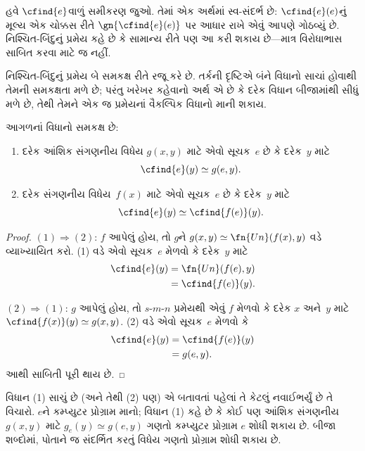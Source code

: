 હવે $\cfind{e}$વાળું સમીકરણ જુઓ. તેમાં એક અર્થમાં
સ્વ-સંદર્ભ છે: $\cfind{e}(e)$નું મૂલ્ય એક ચોક્કસ રીતે
$\gn{\cfind{e}(e)}$ પર આધાર રાખે એવું આપણે ગોઠવ્યું છે.
નિશ્ચિત-બિંદુનું પ્રમેય કહે છે કે સામાન્ય રીતે પણ આ કરી
શકાય છે---માત્ર વિરોધાભાસ સાબિત કરવા માટે જ નહીં.

 નિશ્ચિત-બિંદુનું પ્રમેય બે સમકક્ષ
રીતે રજૂ કરે છે. તર્કની દૃષ્ટિએ બંને વિધાનો સાચાં હોવાથી
તેમની સમકક્ષતા મળે છે; પરંતુ ખરેખર કહેવાનો અર્થ એ છે કે
દરેક વિધાન બીજામાંથી સીધું મળે છે, તેથી તેમને એક જ પ્રમેયનાં
વૈકલ્પિક વિધાનો માની શકાય.

\begin{lem}
આગળનાં વિધાનો સમકક્ષ છે:
\begin{enumerate}
\item દરેક આંશિક સંગણનીય વિધેય $g(x,y)$ માટે એવો
  સૂચક~$e$ છે કે દરેક~$y$ માટે
\[
\cfind{e}(y) \simeq g(e,y).
\]
\item દરેક સંગણનીય વિધેય~$f(x)$ માટે એવો સૂચક~$e$
  છે કે દરેક~$y$ માટે
\[
\cfind{e}(y) \simeq \cfind{f(e)}(y).
\]
\end{enumerate}
\end{lem}

\begin{proof}
$(1) \Rightarrow (2)$: $f$ આપેલું હોય, તો $g$ને
$g(x,y) \simeq \fn{Un}(f(x),y)$ વડે વ્યાખ્યાયિત કરો.
(1) વડે એવો સૂચક~$e$ મેળવો કે દરેક~$y$ માટે
\begin{align*}
\cfind{e}(y) & = \fn{Un}(f(e),y) \\
& = \cfind{f(e)}(y).
\end{align*}

$(2) \Rightarrow (1)$: $g$ આપેલું હોય, તો $s$-$m$-$n$
પ્રમેયથી એવું $f$ મેળવો કે દરેક $x$ અને~$y$ માટે
$\cfind{f(x)}(y) \simeq g(x,y)$. (2) વડે એવો સૂચક~$e$
મેળવો કે
\begin{align*}
\cfind{e}(y) & = \cfind{f(e)}(y) \\
& = g(e,y).
\end{align*}
આથી સાબિતી પૂરી થાય છે.
\end{proof}

\begin{explain}
વિધાન (1) સાચું છે (અને તેથી (2) પણ) એ બતાવતાં પહેલાં
તે કેટલું નવાઈભર્યું છે તે વિચારો. $e$ને કમ્પ્યુટર પ્રોગ્રામ
માનો; વિધાન (1) કહે છે કે કોઈ પણ આંશિક સંગણનીય
$g(x,y)$ માટે $g_e(y) \simeq g(e,y)$ ગણતો કમ્પ્યુટર
પ્રોગ્રામ $e$ શોધી શકાય છે. બીજા શબ્દોમાં, પોતાને જ
સંદર્ભિત કરતું વિધેય ગણતો પ્રોગ્રામ શોધી શકાય છે.
\end{explain}

